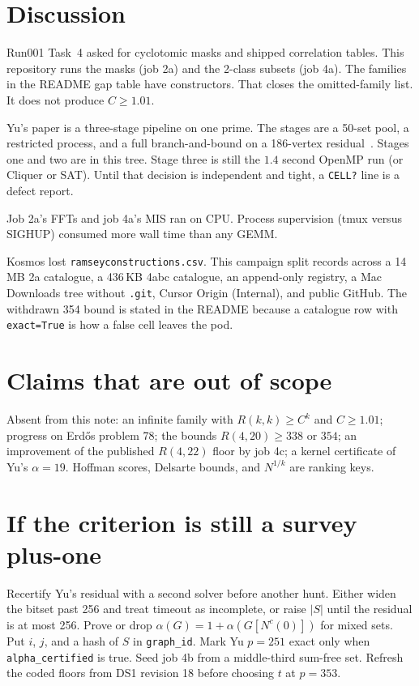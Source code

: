 \documentclass[11pt,a4paper]{article}
\begin{document}
\section{Discussion}

Run001 Task~4 asked for cyclotomic masks and shipped correlation
tables. This repository runs the masks (job 2a) and the 2-class subsets
(job 4a). The families in the README gap table have constructors. That
closes the omitted-family list. It does not produce $C\ge 1.01$.

Yu's paper is a three-stage pipeline on one prime. The stages are a
50-set pool, a restricted process, and a full branch-and-bound on a
186-vertex residual~\cite{yu}. Stages one and two are in this tree.
Stage three is still the $1.4$ second OpenMP run (or Cliquer or SAT).
Until that decision is independent and tight, a \texttt{CELL?} line is
a defect report.

Job 2a's FFTs and job 4a's MIS ran on CPU. Process supervision (tmux
versus SIGHUP) consumed more wall time than any GEMM.

Kosmos lost \texttt{ramseyconstructions.csv}. This campaign split
records across a 14\,MB 2a catalogue, a 436\,KB 4abc catalogue, an
append-only registry, a Mac Downloads tree without \texttt{.git},
Cursor Origin (Internal), and public GitHub. The withdrawn 354 bound
is stated in the README because a catalogue row with
\texttt{exact=True} is how a false cell leaves the pod.

\section{Claims that are out of scope}

Absent from this note: an infinite family with $R(k,k)\ge C^k$ and
$C\ge 1.01$; progress on Erd\H{o}s problem 78; the bounds
$R(4,20)\ge 338$ or $354$; an improvement of the published $R(4,22)$
floor by job 4c; a kernel certificate of Yu's $\alpha=19$.
Hoffman scores, Delsarte bounds, and $N^{1/k}$ are ranking keys.

\section{If the criterion is still a survey plus-one}

Recertify Yu's residual with a second solver before another hunt.
Either widen the bitset past 256 and treat timeout as incomplete, or
raise $|S|$ until the residual is at most 256. Prove or drop
$\alpha(G)=1+\alpha(G[N^c(0)])$ for mixed sets. Put $i$, $j$, and a
hash of $S$ in \texttt{graph\_id}. Mark Yu $p=251$ exact only when
\texttt{alpha\_certified} is true. Seed job 4b from a middle-third
sum-free set. Refresh the coded floors from DS1 revision 18 before
choosing $t$ at $p=353$.
\end{document}
